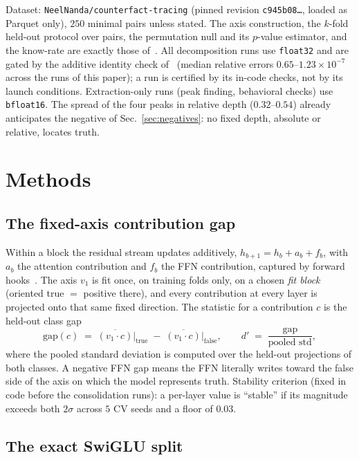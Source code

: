 \documentclass[11pt]{article}
\begin{document}
Dataset: \texttt{NeelNanda/counterfact-tracing} (pinned revision
\texttt{c945b08\ldots}, loaded as Parquet only), $250$ minimal pairs unless
stated. The axis construction, the $k$-fold held-out protocol over pairs, the
permutation null and its $p$-value estimator, and the know-rate are exactly
those of~\cite{companion}. All decomposition runs use \texttt{float32} and
are gated by the additive identity check of~\cite{companion} (median relative
errors $0.65$--$1.23 \times 10^{-7}$ across the runs of this paper); a run is
certified by its in-code checks, not by its launch conditions.
Extraction-only runs (peak finding, behavioral checks) use
\texttt{bfloat16}. The spread of the four peaks in relative depth
($0.32$--$0.54$) already anticipates the negative of
Sec.~\ref{sec:negatives}: no fixed depth, absolute or relative, locates
truth.

\section{Methods}
\label{sec:methods}

\subsection{The fixed-axis contribution gap}
\label{sec:fixedaxis}

Within a block the residual stream updates additively,
$h_{b+1} = h_b + a_b + f_b$, with $a_b$ the attention contribution and $f_b$
the FFN contribution, captured by forward hooks~\cite{companion}. The axis
$v_1$ is fit once, on training folds only, on a chosen \emph{fit block}
(oriented true $=$ positive there), and every contribution at every layer is
projected onto that same fixed direction. The statistic for a contribution
$c$ is the held-out class gap
\begin{equation}
\mathrm{gap}(c) \;=\; \overline{(v_1 \cdot c)}\big|_{\mathrm{true}}
\;-\; \overline{(v_1 \cdot c)}\big|_{\mathrm{false}},
\qquad
d' \;=\; \frac{\mathrm{gap}}{\text{pooled std}},
\end{equation}
where the pooled standard deviation is computed over the held-out
projections of both classes. A negative FFN gap means the FFN literally
writes toward the false side of the axis on which the model represents
truth. Stability criterion (fixed in code before the consolidation runs): a
per-layer value is ``stable'' if its magnitude exceeds both $2\sigma$ across
$5$ CV seeds and a floor of $0.03$.

\subsection{The exact SwiGLU split}
\label{sec:swiglu}
\end{document}
